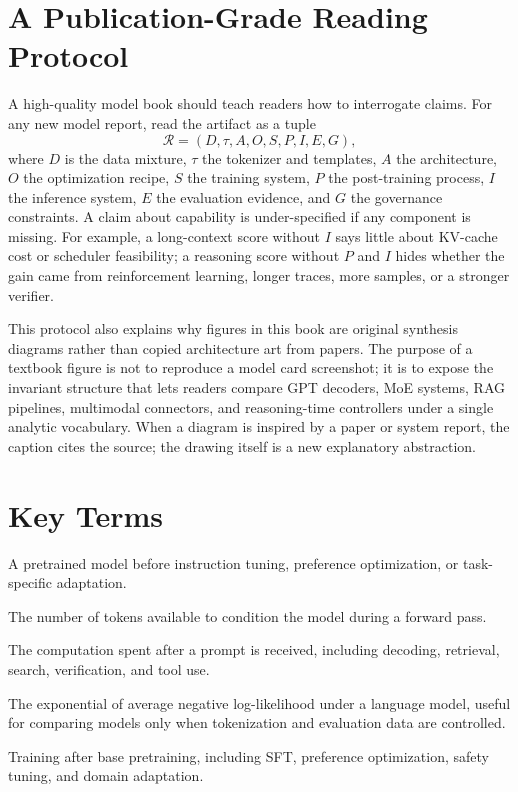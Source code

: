 \section{A Publication-Grade Reading Protocol}
\label{sec:publication-grade-reading-protocol}

A high-quality model book should teach readers how to interrogate claims. For any new model report, read the artifact as a tuple
\begin{equation}
  \mathcal{R} =
  (D, \tau, A, O, S, P, I, E, G),
\end{equation}
where $D$ is the data mixture, $\tau$ the tokenizer and templates, $A$ the architecture, $O$ the optimization recipe, $S$ the training system, $P$ the post-training process, $I$ the inference system, $E$ the evaluation evidence, and $G$ the governance constraints. A claim about capability is under-specified if any component is missing. For example, a long-context score without $I$ says little about KV-cache cost or scheduler feasibility; a reasoning score without $P$ and $I$ hides whether the gain came from reinforcement learning, longer traces, more samples, or a stronger verifier.

This protocol also explains why figures in this book are original synthesis diagrams rather than copied architecture art from papers. The purpose of a textbook figure is not to reproduce a model card screenshot; it is to expose the invariant structure that lets readers compare GPT decoders, MoE systems, RAG pipelines, multimodal connectors, and reasoning-time controllers under a single analytic vocabulary. When a diagram is inspired by a paper or system report, the caption cites the source; the drawing itself is a new explanatory abstraction.

\section{Key Terms}
\label{sec:chapter-one-key-terms}

\begin{description}
\item[Base model] A pretrained model before instruction tuning, preference optimization, or task-specific adaptation.
\item[Context length] The number of tokens available to condition the model during a forward pass.
\item[Inference budget] The computation spent after a prompt is received, including decoding, retrieval, search, verification, and tool use.
\item[Perplexity] The exponential of average negative log-likelihood under a language model, useful for comparing models only when tokenization and evaluation data are controlled.
\item[Post-training] Training after base pretraining, including SFT, preference optimization, safety tuning, and domain adaptation.
\end{description}

